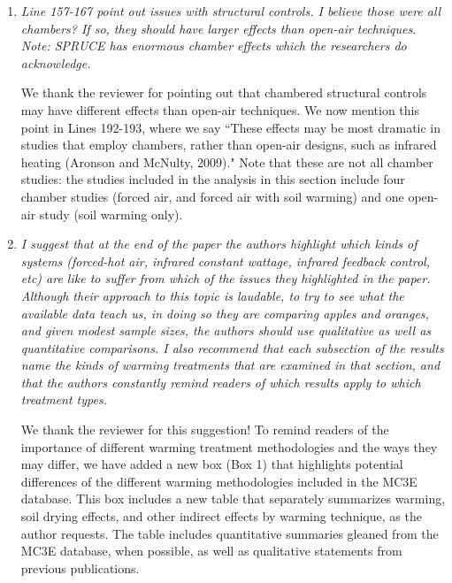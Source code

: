 \documentclass[11pt,a4paper]{letter}
\begin{document}
\begin{letter}{}
\begin{enumerate}
\begin{enumerate}
\item  \emph{Line 157-167 point out issues with structural controls. I believe those were all
chambers? If so, they should have larger effects than open-air techniques.
Note: SPRUCE has enormous chamber effects which the researchers do
acknowledge.}\\

\par We thank the reviewer for pointing out that chambered structural controls may have different effects than open-air techniques. We now mention this point in Lines 192-193, where we say ``These effects may be most dramatic in studies that employ chambers, rather than open-air designs, such as infrared heating (Aronson and McNulty, 2009)." Note that these are not all chamber studies: the studies included in the analysis in this section include four chamber studies (forced air, and forced air with soil warming) and one open-air study (soil warming only). 

\item \emph{ I suggest that at the end of the paper the authors highlight which kinds
of systems (forced-hot air, infrared constant wattage, infrared feedback
control, etc) are like to suffer from which of the issues they highlighted in
the paper. Although their approach to this topic is laudable, to try to
see what the available data teach us, in doing so they are comparing
apples and oranges, and given modest sample sizes, the authors
should use qualitative as well as quantitative comparisons. I also
recommend that each subsection of the results name the kinds of
warming treatments that are examined in that section, and that the
authors constantly remind readers of which results apply to which
treatment types.}\\

\par We thank the reviewer for this suggestion! To remind readers of the importance of different warming treatment methodologies and the ways they may differ, we have added a new box (Box 1) that highlights potential differences of the different warming methodologies included in the MC3E database. This box includes a new table that separately summarizes warming, soil drying effects, and other indirect effects by warming technique, as the author requests. The table includes quantitative summaries gleaned from the MC3E database, when possible, as well as qualitative statements from previous publications.


\end{enumerate}
\end{enumerate}
\end{letter}
\end{document}
